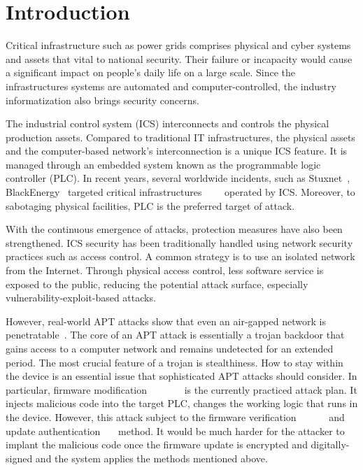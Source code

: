 \section{Introduction}
\label{sec:implant-introduction}

Critical infrastructure such as power grids comprises physical and cyber systems and assets that vital to national security. Their failure or incapacity would cause a significant impact on people's daily life on a large scale. Since the infrastructures systems are automated and computer-controlled, the industry informatization also brings security concerns. 

The industrial control system (ICS) interconnects and controls the physical production assets.  Compared to traditional IT infrastructures, the physical assets and the computer-based network's interconnection is a unique ICS feature. It is managed through an embedded system known as the programmable logic controller (PLC). In recent years, several worldwide incidents, such as Stuxnet~\cite{langner2011stuxnet}, BlackEnergy~\cite{cherepanov2016blackenergy} targeted critical infrastructures~\cite{case2016analysis}~\cite{soltan2016power}~\cite{zhang2013time}~\cite{williams2016power} operated by ICS. Moreover, to sabotaging physical facilities, PLC is the preferred target of attack.

With the continuous emergence of attacks, protection measures have also been strengthened. ICS security has been traditionally handled using network security practices such as access control. A common strategy is to use an isolated network from the Internet. Through physical access control, less software service is exposed to the public, reducing the potential attack surface, especially vulnerability-exploit-based attacks. 

However, real-world APT attacks show that even an air-gapped network is penetratable~\cite{langner2011stuxnet}. The core of an APT attack is essentially a trojan backdoor that gains access to a computer network and remains undetected for an extended period. The most crucial feature of a trojan is stealthiness. How to stay within the device is an essential issue that sophisticated APT attacks should consider. In particular, firmware modiﬁcation~\cite{garcia2017hey}~\cite{newman2011scada}~\cite{basnight2013firmware}~\cite{blanco2012one}~\cite{cui2013firmware}~\cite{konstantinou2015impact}~\cite{schulz2017nexmon} is the currently practiced attack plan. It injects malicious code into the target PLC, changes the working logic that runs in the device. However, this attack subject to the firmware verification~\cite{mcminn2012firmware}~\cite{wang2015confirm}~\cite{lee2016binding}~\cite{li2011viper}~\cite{seshadri2004swatt}~\cite{li2010sbap} and update authentication~\cite{lee2017blockchain}~\cite{moran2019firmware}~\cite{choi2016secure} method. It would be much harder for the attacker to implant the malicious code once the firmware update is encrypted and digitally-signed and the system applies the methods mentioned above. 

